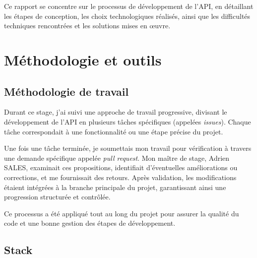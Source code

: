\documentclass{article}
\begin{document}
	Ce rapport se concentre sur le processus de développement de l’API, en détaillant les étapes de conception, les choix technologiques réalisés, ainsi que les difficultés techniques rencontrées et les solutions mises en œuvre.
	
	\newpage
	\section{Méthodologie et outils}
	
	\subsection{Méthodologie de travail}
	
	Durant ce stage, j'ai suivi une approche de travail progressive, divisant le développement de l'API en plusieurs tâches spécifiques (appelées \textit{issues}). Chaque tâche correspondait à une fonctionnalité ou une étape précise du projet.
	
	Une fois une tâche terminée, je soumettais mon travail pour vérification à travers une demande spécifique appelée \textit{pull request}. Mon maître de stage, Adrien SALES, examinait ces propositions, identifiait d'éventuelles améliorations ou corrections, et me fournissait des retours. Après validation, les modifications étaient intégrées à la branche principale du projet, garantissant ainsi une progression structurée et contrôlée.
	
	Ce processus a été appliqué tout au long du projet pour assurer la qualité du code et une bonne gestion des étapes de développement.
	
	\subsection{Stack}
	
\end{document}
